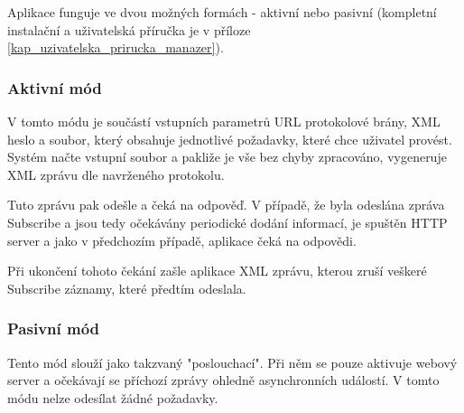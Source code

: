 Aplikace funguje ve dvou možných formách - aktivní nebo pasivní (kompletní instalační a uživatelská příručka je v příloze \ref{kap_uzivatelska_prirucka_manazer}).

\subsubsection*{Aktivní mód}
V tomto módu je součástí vstupních parametrů URL protokolové brány, XML heslo a soubor, který obsahuje jednotlivé požadavky, které chce
uživatel provést. Systém načte vstupní soubor a pakliže je vše bez chyby zpracováno, vygeneruje XML zprávu dle navrženého protokolu. 

Tuto zprávu pak odešle a čeká na odpověď. V případě, že byla odeslána zpráva Subscribe a jsou tedy očekávány periodické dodání informací,
je spuštěn HTTP server a jako v předchozím případě, aplikace čeká na odpovědi.

Při ukončení tohoto čekání zašle aplikace XML zprávu, kterou zruší veškeré Subscribe záznamy, které předtím odeslala.

\subsubsection*{Pasivní mód}
Tento mód slouží jako takzvaný "poslouchací". Při něm se pouze aktivuje webový server a očekávají se příchozí zprávy ohledně asynchronních událostí.
V tomto módu nelze odesílat žádné požadavky.

